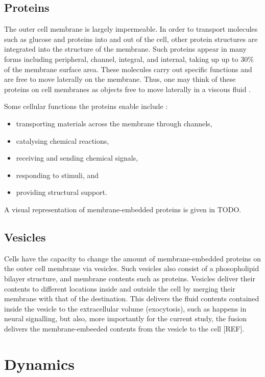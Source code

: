 \documentclass{report}
\begin{document}
\section{Proteins}
The outer cell membrane is largely impermeable. In order to transport molecules such as glucose and proteins into and out of the cell, other protein structures are integrated into the structure of the membrane. Such proteins appear in many forms including peripheral, channel, integral, and internal, taking up up to 30\% of the membrane surface area. These molecules carry out specific functions and are free to move laterally on the membrane. Thus, one may think of these proteins on cell membranes as objects free to move laterally in a viscous fluid \cite{marrink2019computational}.

Some cellular functions the proteins enable include \cite{alberts2002protein}:
\begin{itemize}
	\item transporting materials across the membrane through channels,
	\item catalysing chemical reactions,
	\item receiving and sending chemical signals,
	\item responding to stimuli, and
	\item providing structural support.
\end{itemize}

A visual representation of membrane-embedded proteins is given in TODO.

\section{Vesicles}
Cells have the capacity to change the amount of membrane-embedded proteins on the outer cell membrane via vesicles. Such vesicles also consist of a phosopholipid bilayer structure, and membrane contents such as proteins. Vesicles deliver their contents to different locations inside and outside the cell by merging their membrane with that of the destination. This delivers the fluid contents contained inside the vesicle to the extracellular volume (exocytosis), such as happens in neural signalling, but also, more importantly for the current study, the fusion delivers the membrane-embeeded contents from the vesicle to the cell [REF].

\chapter{Dynamics}
\end{document}
